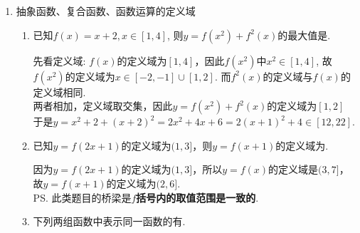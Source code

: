 \begin{enumerate}
\begin{enumerate}
\begin{jieda}
        \end{jieda}
        \item 记不超过$x$的最大整数为$[x]$，$\{x\} = x - [x]$
        上述命题中正确的序号是
        \begin{jieda}
            容易判断前两个分别是真和假，第三个应为必要不充分，第四个可以分离$\{x\}$，得到$2\{x\} = 1 + \frac{1}{x}$，转化为两函数的交点，根据图象和对称性可知第四个是正确的.
        \end{jieda}
    \end{enumerate}
    \item 抽象函数、复合函数、函数运算的定义域
    \begin{enumerate}
        \item 已知$f(x)=x+2, x\in[1,4]$, 则$y=f(x^2)+f^2(x)$的最大值是. 
        \begin{jieda}
        先看定义域: $f(x)$的定义域为$[1,4]$，因此$f(x^2)$中$x^2\in[1,4]$, 故$f(x^2)$的定义域为$x\in[-2,-1] \cup [1,2]$. 而$f^2(x)$的定义域与$f(x)$的定义域相同.\\
        两者相加，定义域取交集，因此$y=f(x^2)+f^2(x)$的定义域为$[1, 2]$ \\
        于是$y=x^2+2+(x+2)^2=2x^2+4x+6=2(x+1)^2+4\in[12,22]$.
        \end{jieda}
        \item 已知$y = f(2x+1)$的定义域为$(1, 3]$，则$y = f(x+1)$的定义域为\blkda{$(2, 6]$}. 
        \begin{jieda}
            因为$y = f(2x+1)$的定义域为$(1, 3]$，所以$y = f(x)$的定义域是$(3,7]$，故$y = f(x+1)$的定义域为$(2, 6]$. \\
            \ps 此类题目的桥梁是\textbf{$f$括号内的取值范围是一致的}.
        \end{jieda}
        \item 下列两组函数中表示同一函数的有. \\
\end{enumerate}
\end{enumerate}
